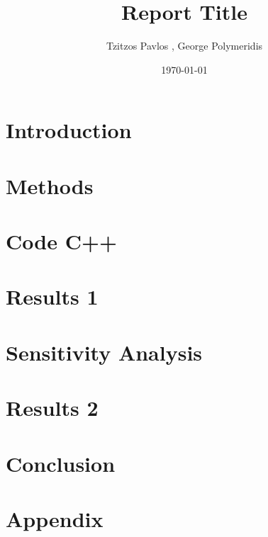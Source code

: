 \documentclass[12pt,twoside]{report}
\title{Report Title}
\author{Tzitzos Pavlos , George Polymeridis}
\date{\today}
\begin{document}


\tableofcontents

\chapter{Introduction}


\chapter{Methods}


\chapter{Code C++}


\chapter{Results 1}


\chapter{Sensitivity Analysis}


\chapter{Results 2}


\chapter{Conclusion}


\appendix
\chapter{Appendix}


\printbibliography
\end{document}
